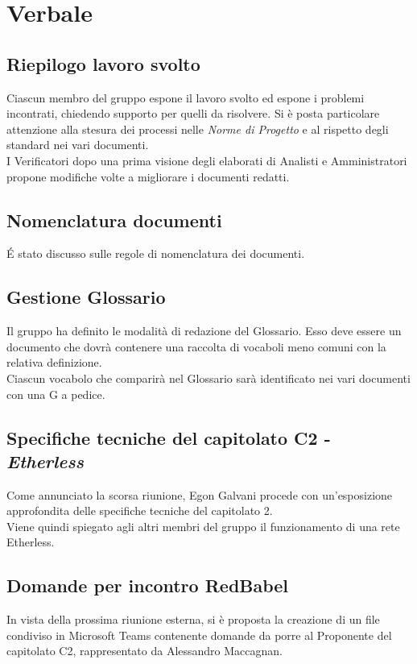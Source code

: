 \section{Verbale}
	
	\subsection{Riepilogo lavoro svolto}
		Ciascun membro del gruppo espone il lavoro svolto ed espone i problemi incontrati, chiedendo supporto per quelli da risolvere. Si è posta particolare attenzione alla stesura dei processi nelle \textit{Norme di Progetto} e al rispetto degli standard nei vari documenti.\\
		I Verificatori dopo una prima visione degli elaborati di Analisti e Amministratori propone modifiche volte a migliorare i documenti redatti.
		
		
	\subsection{Nomenclatura documenti}
		\'E stato discusso sulle regole di nomenclatura dei documenti.
		
		
	\subsection{Gestione Glossario}
		Il gruppo ha definito le modalità di redazione del Glossario. Esso deve essere un documento che dovrà contenere una raccolta di vocaboli meno comuni con la relativa definizione.\\
		Ciascun vocabolo che comparirà nel Glossario sarà identificato nei vari documenti con una G a pedice.


	\subsection{Specifiche tecniche del capitolato C2 - \textit{Etherless}}
		Come annunciato la scorsa riunione, Egon Galvani procede con un'esposizione approfondita delle specifiche tecniche del capitolato 2.\\
		Viene quindi spiegato agli altri membri del gruppo il funzionamento di una rete Etherless.
		
	
	\subsection{Domande per incontro RedBabel}
		In vista della prossima riunione esterna, si è proposta la creazione di un file condiviso in Microsoft Teams contenente domande da porre al Proponente del capitolato C2, rappresentato da Alessandro Maccagnan.


